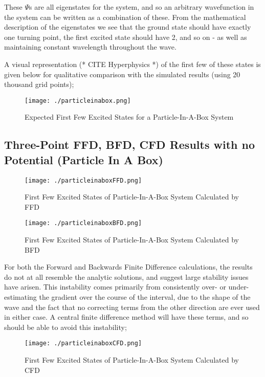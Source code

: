 These $\Psi$s are all eigenstates for the system, and so an arbitrary wavefunction in the system can be written as a combination of these. From the mathematical description of the eigenstates we see that the ground state should have exactly one turning point, the first excited state should have 2, and so on - as well as maintaining constant wavelength throughout the wave.

A visual representation (* CITE Hyperphysics *) of the first few of these states is given below for qualitative comparison with the simulated results (using 20 thousand grid points);

\begin{figure}[H]
	\texttt{[image: ./particleinabox.png]}
	\centering
	\caption{Expected First Few Excited States for a Particle-In-A-Box System}
\end{figure}

\subsection{Three-Point FFD, BFD, CFD Results with no Potential (Particle In A Box)}
\begin{figure}[H]
	\texttt{[image: ./particleinaboxFFD.png]}
	\centering
	\caption{First Few Excited States of Particle-In-A-Box System Calculated by FFD}
\end{figure}

\begin{figure}[H]
	\texttt{[image: ./particleinaboxBFD.png]}
	\centering
	\caption{First Few Excited States of Particle-In-A-Box System Calculated by BFD}
\end{figure}

For both the Forward and Backwards Finite Difference calculations, the results do not at all resemble the analytic solutions, and suggest large stability issues have arisen. This instability comes primarily from consistently over- or under-estimating the gradient over the course of the interval, due to the shape of the wave and the fact that no correcting terms from the other direction are ever used in either case. A central finite difference method will have these terms, and so should be able to avoid this instability;

\begin{figure}[H]
	\texttt{[image: ./particleinaboxCFD.png]}
	\centering
	\caption{First Few Excited States of Particle-In-A-Box System Calculated by CFD}
\end{figure}

